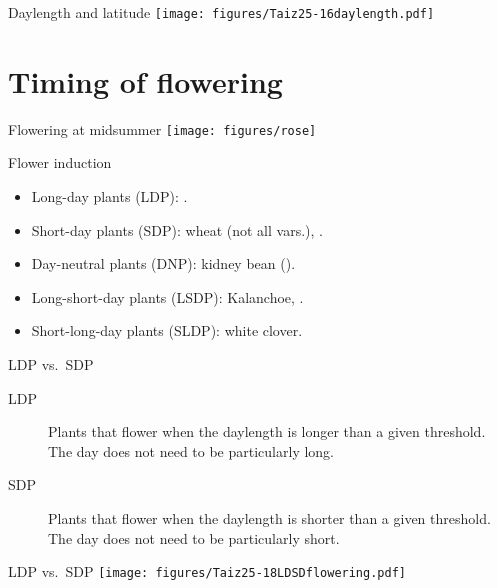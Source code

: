 \documentclass[10pt]{beamer}
\begin{document}
\begin{frame}{Daylength and latitude}
    \centering
    \texttt{[image: figures/Taiz25-16daylength.pdf]}\\
    {\small \autocite[from][]{TaiZei2006}}
\end{frame}

\section{Timing of flowering}

\begin{frame}{Flowering at midsummer}
    \centering
    \texttt{[image: figures/rose]}
\end{frame}

\begin{frame}{Flower induction}
    \begin{itemize}
        \item Long-day plants (LDP): .
        \item Short-day plants (SDP): wheat (not all vars.), .
        \item Day-neutral plants (DNP): kidney bean ().
        \item Long-short-day plants (LSDP): Kalanchoe, .
        \item Short-long-day plants (SLDP): white clover.
    \end{itemize}
\end{frame}

\begin{frame}{LDP vs.\ SDP}
    \begin{description}
        \item[LDP] Plants that flower when the daylength is longer than a given threshold. The day does not need to be particularly long.
        \item[SDP] Plants that flower when the daylength is shorter than a given threshold. The day does not need to be particularly short.
    \end{description}
\end{frame}

\begin{frame}{LDP vs.\ SDP}
    \centering
    \texttt{[image: figures/Taiz25-18LDSDflowering.pdf]}\\
    {\small \autocite[from][]{TaiZei2006}}
\end{frame}
\end{document}
